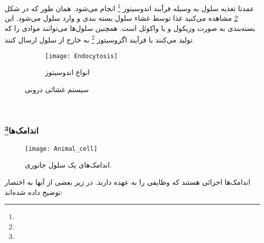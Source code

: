 عمدتا تغذیه سلول به وسیله فرآیند اندوسیتوز
\footnote{}
انجام می‌شود. همان طور که در شکل
\ref{figure:Endocytosis}
مشاهده می‌کنید غذا توسط غشاء سلول بسته بندی و وارد سلول می‌شود.
این بسته‌بندی به صورت وزیکول و یا واکوئل است.
همچنین سلول‌ها می‌توانند موادی را که تولید می‌کنند با فرآیند اگزوسیتوز
\footnote{}
به خارج از سلول ارسال کنند.

\pagebreak
\begin{figure}[t]
	\centering

    \qquad
    	\bigskip
	
	\begin{subfigure}[b]{0.85\textwidth}
		\centering
		\texttt{[image: Endocytosis]}
		\caption{انواع اندوسیتوز}
		\label{figure:Endocytosis}
	\end{subfigure}	
	\caption{سیستم غشائی درونی}
\end{figure} 

~

\pagebreak
\subsubsection{اندامک‌ها\protect\footnote{}}

\begin{figure}[t]
	\centering
	\texttt{[image: Animal\_cell]}
	\caption{ اندامک‌های یک سلول جانوری.
	}
	\label{figure:Organelle}
\end{figure}

اندامک‌ها اجزائی هستند که وظایفی را به عهده دارند.  در زیر بعضی از آنها به اختصار توضیح داده شده‌اند:

